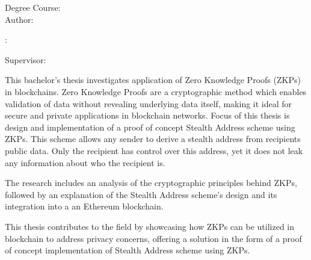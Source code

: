 \begin{minipage}[t]{1\columnwidth}
    \FIITuniversity

    \FIITfaculty

    Degree Course: \FIITstudyProgram\\

    Author: \FIITauthor

    \FIITthesis: \FIITtitle

    Supervisor: \FIITsupervisor

    \FIITdate
\end{minipage}

\bigskip{}

This bachelor's thesis investigates application of Zero Knowledge Proofs
(ZKPs) in blockchains. Zero Knowledge Proofs are a cryptographic
method which enables validation of data without revealing underlying
data itself, making it ideal for secure and private applications in
blockchain networks. Focus of this thesis is design and implementation
of a proof of concept Stealth Address scheme using ZKPs. This scheme allows
any sender to derive a stealth address from recipients public data. Only the
recipient has control over this address, yet it does not leak any information
about who the recipient is.

The research includes an analysis of the cryptographic principles behind
ZKPs, followed by an explanation of the Stealth Address scheme's design and
its integration into a an Ethereum blockchain.

This thesis contributes to the field by showcasing how ZKPs can be utilized
in blockchain to address privacy concerns, offering a solution in the form of
a proof of concept  implementation of Stealth Address scheme using ZKPs.

\newpage{}\thispagestyle{empty}

\emptypage
